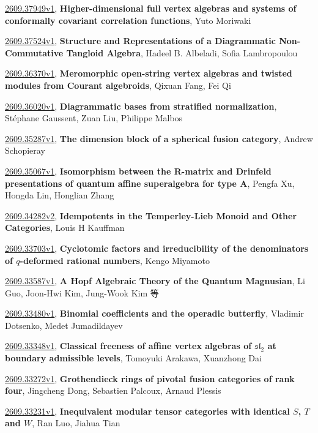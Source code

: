 \documentclass[9pt, a4paper]{article}
\theoremstyle{plain}
\theoremstyle{definition}
\theoremstyle{remark}
\newcommand{\arxiv}[3]{\href{https://arxiv.org/abs/#1}{#1}, \textbf{\textcolor{arxivblue}{#2}}, #3}
\begin{document}
\arxiv{2609.37949v1}{Higher-dimensional full vertex algebras and systems of conformally covariant correlation functions}{Yuto Moriwaki}

\arxiv{2609.37524v1}{Structure and Representations of a Diagrammatic Non-Commutative Tangloid Algebra}{Hadeel B. Albeladi, Sofia Lambropoulou}

\arxiv{2609.36370v1}{Meromorphic open-string vertex algebras and twisted modules from Courant algebroids}{Qixuan Fang, Fei Qi}

\arxiv{2609.36020v1}{Diagrammatic bases from stratified normalization}{Stéphane Gaussent, Zuan Liu, Philippe Malbos}

\arxiv{2609.35287v1}{The dimension block of a spherical fusion category}{Andrew Schopieray}

\arxiv{2609.35067v1}{Isomorphism between the R-matrix and Drinfeld presentations of quantum affine superalgebra for type $\boldsymbol{A}$}{Pengfa Xu, Hongda Lin, Honglian Zhang}

\arxiv{2609.34282v2}{Idempotents in the Temperley-Lieb Monoid and Other Categories}{Louis H Kauffman}

\arxiv{2609.33703v1}{Cyclotomic factors and irreducibility of the denominators of $q$-deformed rational numbers}{Kengo Miyamoto}

\arxiv{2609.33587v1}{A Hopf Algebraic Theory of the Quantum Magnusian}{Li Guo, Joon-Hwi Kim, Jung-Wook Kim 等}

\arxiv{2609.33480v1}{Binomial coefficients and the operadic butterfly}{Vladimir Dotsenko, Medet Jumadildayev}

\arxiv{2609.33348v1}{Classical freeness of affine vertex algebras of $\mathfrak{sl}_2$ at boundary admissible levels}{Tomoyuki Arakawa, Xuanzhong Dai}

\arxiv{2609.33272v1}{Grothendieck rings of pivotal fusion categories of rank four}{Jingcheng Dong, Sebastien Palcoux, Arnaud Plessis}

\arxiv{2609.33231v1}{Inequivalent modular tensor categories with identical $S$, $T$ and $W$}{Ran Luo, Jiahua Tian}

\end{document}
